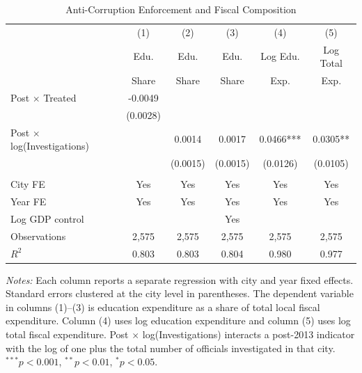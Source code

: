 \begin{table}[t]
\centering
\caption{Anti-Corruption Enforcement and Fiscal Composition}
\label{tab:main}
\small
\begin{tabular}{lccccc}
\hline\hline
    & (1) & (2) & (3) & (4) & (5) \\
    & Edu. & Edu. & Edu. & Log Edu. & Log Total \\
    & Share & Share & Share & Exp. & Exp. \\
\hline
    Post $\times$ Treated & -0.0049 & & & & \\
    & (0.0028) & & & & \\
    Post $\times$ log(Investigations) & & 0.0014 & 0.0017 & 0.0466*** & 0.0305** \\
    & & (0.0015) & (0.0015) & (0.0126) & (0.0105) \\
    \\
    City FE & Yes & Yes & Yes & Yes & Yes \\
    Year FE & Yes & Yes & Yes & Yes & Yes \\
    Log GDP control & & & Yes & & \\
    Observations & 2,575 & 2,575 & 2,575 & 2,575 & 2,575 \\
    $R^2$ & 0.803 & 0.803 & 0.804 & 0.980 & 0.977 \\
\hline\hline
\end{tabular}
\begin{tablenotes}
\item \textit{Notes:} Each column reports a separate regression with city and year fixed effects.
Standard errors clustered at the city level in parentheses.
The dependent variable in columns (1)--(3) is education expenditure as a share of total
local fiscal expenditure. Column (4) uses log education expenditure and column (5) uses
log total fiscal expenditure. Post $\times$ log(Investigations) interacts a post-2013
indicator with the log of one plus the total number of officials investigated in that city.
$^{***}p<0.001$, $^{**}p<0.01$, $^{*}p<0.05$.
\end{tablenotes}
\end{table}
